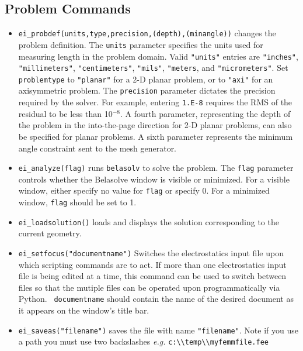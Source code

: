 \subsection{Problem Commands}

\begin{itemize}
\item {\tt ei\_probdef(units,type,precision,(depth),(minangle))} changes the problem
definition. The \texttt{units} parameter specifies the units used
for measuring length in the problem domain. Valid \texttt{"units"}
entries are
\texttt{"inches"}, \texttt{"millimeters"}, \texttt{"centimeters"},
\texttt{"mils"}, \texttt{"meters}, and \texttt{"micrometers"}. Set
\texttt{problemtype} to \texttt{"planar"} for a 2-D planar problem, or to
\texttt{"axi"} for an axisymmetric problem. The \texttt{precision} parameter
dictates the precision required by the solver. For example, entering
\texttt{1.E-8} requires the RMS of the residual to be less than 10$^{ - 8}$.
A fourth parameter, representing the depth of the problem in the
into-the-page direction for 2-D planar problems, can also be specified
for planar problems. A sixth parameter represents the minimum angle constraint sent to the mesh generator.

\item {\tt ei\_analyze(flag)} runs \texttt{belasolv} to solve the problem. The
\texttt{flag} parameter controls whether the Belasolve window is visible or
minimized. For a visible window, either specify no value for
\texttt{flag} or specify 0. For a minimized window, \texttt{flag}
should be set to 1.

\item {\tt ei\_loadsolution()} loads and displays the solution corresponding to the
current geometry.

\item {\tt ei\_setfocus("documentname")} Switches the
electrostatics input file upon which scripting commands are to act. If
more than one electrostatics input file is being edited at a time,
this command can be used to switch between files so that the
mutiple files can be operated upon programmatically via Python. {\tt
documentname} should contain the name of the desired document as
it appears on the window's title bar.

\item {\tt ei\_saveas("filename")} saves the file with name
\texttt{"filename"}. Note if you use a path you must use two backslashes
{\em e.g.} \verb+c:\\temp\\myfemmfile.fee+

\end{itemize}

